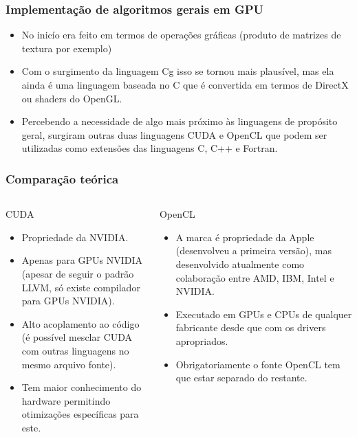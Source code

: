 \documentclass[brazil, 10pt]{beamer}
\begin{document}
\begin{frame}
  \frametitle{Implementação de algoritmos gerais em GPU}
  \begin{itemize}
    \item No inicío era feito em termos de operações gráficas (produto de matrizes de textura por exemplo)
    \item Com o surgimento da linguagem Cg isso se tornou mais plausível, mas ela ainda é uma linguagem baseada no C que é convertida em termos de DirectX ou shaders do OpenGL.
    \item Percebendo a necessidade de algo mais próximo às linguagens de propósito geral, surgiram outras duas linguagens CUDA e OpenCL que podem ser utilizadas como extensões das linguagens C, C++ e Fortran.
  \end{itemize}
\end{frame}

\begin{frame}
  \frametitle{Comparação teórica}

\begin{columns}
  \begin{column}{.5\textwidth}
    CUDA
    
    \begin{itemize}
      \item Propriedade da NVIDIA.
      \item Apenas para GPUs NVIDIA (apesar de seguir o padrão LLVM, só existe compilador para GPUs NVIDIA).
      \item Alto acoplamento ao código (é possível mesclar CUDA com outras linguagens no mesmo arquivo fonte).
      \item Tem maior conhecimento do hardware permitindo otimizações específicas para este.
    \end{itemize}
  \end{column}
  \begin{column}{.5\textwidth}
    OpenCL    
    
    \begin{itemize}
      \item A marca é propriedade da Apple (desenvolveu a primeira versão), mas desenvolvido atualmente como colaboração entre AMD, IBM, Intel e NVIDIA.
      \item Executado em GPUs e CPUs de qualquer fabricante desde que com os drivers apropriados.
      \item Obrigatoriamente o fonte OpenCL tem que estar separado do restante.
    \end{itemize}
  \end{column}
\end{columns}
\end{frame}
\end{document}
